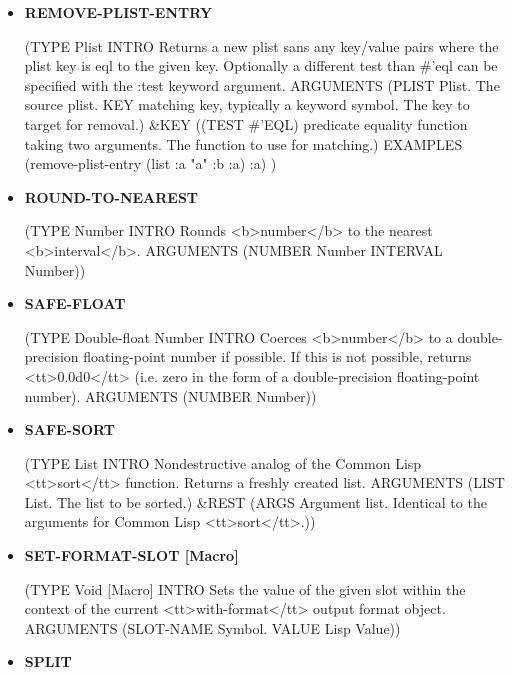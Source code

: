 \documentclass [11pt]{book}
\begin{document}
\begin{itemize}
\item {}
\label{prim:remove-plist-entry}
\textbf{REMOVE-PLIST-ENTRY}

(TYPE Plist INTRO  Returns a new plist sans any key/value pairs where the plist key is eql to the given key.
Optionally a different test than \#'eql can be specified with the :test keyword argument.
 ARGUMENTS (PLIST Plist. The source plist. KEY matching key, typically a keyword symbol. The key to target for removal.) \&KEY ((TEST \#'EQL) predicate equality function taking two arguments. The function to use for matching.) EXAMPLES (remove-plist-entry (list :a "a" :b :a) :a) 
)



\item {}
\label{prim:round-to-nearest}
\textbf{ROUND-TO-NEAREST}

(TYPE Number INTRO  Rounds <b>number</b> to the nearest <b>interval</b>.
 ARGUMENTS (NUMBER Number INTERVAL Number))



\item {}
\label{prim:safe-float}
\textbf{SAFE-FLOAT}

(TYPE Double-float Number INTRO  Coerces <b>number</b> to a double-precision floating-point
number if possible. If this is not possible, returns <tt>0.0d0</tt> (i.e. zero in the form
of a double-precision floating-point number).
 ARGUMENTS (NUMBER Number))



\item {}
\label{prim:safe-sort}
\textbf{SAFE-SORT}

(TYPE List INTRO  Nondestructive analog of the Common Lisp <tt>sort</tt> function.
Returns a freshly created list.
 ARGUMENTS (LIST List. The list to be sorted.) \&REST (ARGS Argument list. Identical to the arguments for Common Lisp <tt>sort</tt>.))



\item {}
\label{prim:set-format-slot}
\textbf{SET-FORMAT-SLOT [Macro]}

(TYPE Void [Macro] INTRO  Sets the value of the given slot within the context of the current
<tt>with-format</tt> output format object.
 ARGUMENTS (SLOT-NAME Symbol. VALUE Lisp Value))



\item {}
\label{prim:split}
\textbf{SPLIT}


\end{itemize}
\end{document}
